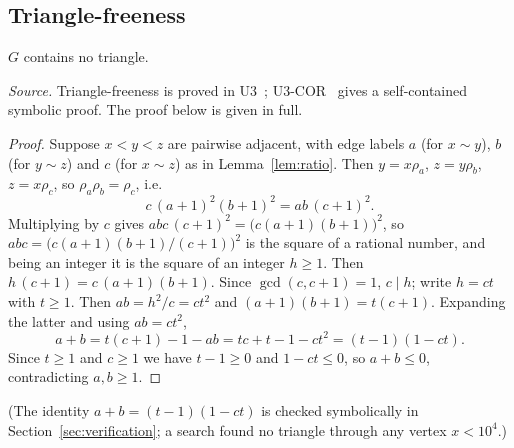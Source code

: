 \subsection{Triangle-freeness}
\begin{theorem}\label{thm:triangle}
$G$ contains no triangle.
\end{theorem}
\noindent\emph{Source.} Triangle-freeness is proved in U3~\cite{u3}; U3-COR~\cite{u3cor} gives a self-contained symbolic proof. The proof below is given in full.
\begin{proof}
Suppose $x<y<z$ are pairwise adjacent, with edge labels $a$ (for $x\sim y$), $b$ (for $y\sim z$) and $c$ (for $x\sim z$) as in Lemma~\ref{lem:ratio}. Then $y=x\rho_a$, $z=y\rho_b$, $z=x\rho_c$, so $\rho_a\rho_b=\rho_c$, i.e.
\begin{equation}\label{eq:tri}
c\,(a+1)^2(b+1)^2=ab\,(c+1)^2.
\end{equation}
Multiplying by $c$ gives $abc\,(c+1)^2=\bigl(c(a+1)(b+1)\bigr)^2$, so $abc=\bigl(c(a+1)(b+1)/(c+1)\bigr)^2$ is the square of a rational number, and being an integer it is the square of an integer $h\ge1$. Then $h\,(c+1)=c\,(a+1)(b+1)$. Since $\gcd(c,c+1)=1$, $c\mid h$; write $h=ct$ with $t\ge1$. Then $ab=h^2/c=ct^2$ and $(a+1)(b+1)=t(c+1)$. Expanding the latter and using $ab=ct^2$,
\[
a+b=t(c+1)-1-ab=tc+t-1-ct^2=(t-1)(1-ct).
\]
Since $t\ge1$ and $c\ge1$ we have $t-1\ge0$ and $1-ct\le0$, so $a+b\le0$, contradicting $a,b\ge1$. \end{proof}
(The identity $a+b=(t-1)(1-ct)$ is checked symbolically in Section~\ref{sec:verification}; a search found no triangle through any vertex $x<10^4$.)

